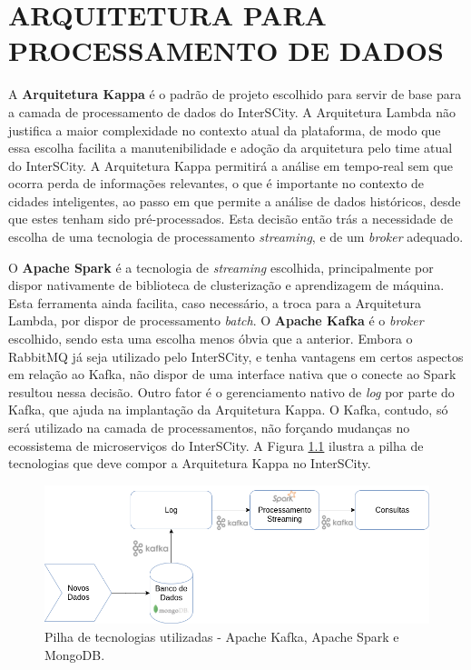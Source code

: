 \chapter[ARQUITETURA PARA PROCESSAMENTO DE DADOS]{ARQUITETURA PARA PROCESSAMENTO DE DADOS}
\label{chapter:architecture}

A \textbf{Arquitetura Kappa} é o padrão de projeto escolhido para servir de
base para a camada de processamento de dados do InterSCity. A Arquitetura
Lambda não justifica a maior complexidade no contexto atual da plataforma, de
modo que essa escolha facilita a manutenibilidade e adoção da arquitetura pelo
time atual do InterSCity. A Arquitetura Kappa permitirá a análise em tempo-real
sem que ocorra perda de informações relevantes, o que é importante no contexto de
cidades inteligentes, ao passo em que permite a análise de dados históricos,
desde que estes tenham sido pré-processados. Esta decisão então trás a
necessidade de escolha de uma tecnologia de processamento \textit{streaming},
e de um \textit{broker} adequado.

O \textbf{Apache Spark} é a tecnologia de \textit{streaming} escolhida,
principalmente por dispor nativamente de biblioteca de clusterização e
aprendizagem de máquina. Esta ferramenta ainda facilita, caso necessário, a
troca para a Arquitetura Lambda, por dispor de processamento \textit{batch}.
O \textbf{Apache Kafka} é o \textit{broker} escolhido, sendo esta uma escolha
menos óbvia que a anterior. Embora o RabbitMQ já seja utilizado pelo
InterSCity, e tenha vantagens em certos aspectos em relação ao Kafka, não
dispor de uma interface nativa que o conecte ao Spark resultou nessa decisão.
Outro fator é o gerenciamento nativo de \textit{log} por parte do
Kafka, que ajuda na implantação da Arquitetura Kappa. O Kafka, contudo, só
será utilizado na camada de processamentos, não forçando mudanças no
ecossistema de microserviços do InterSCity. A Figura \ref{fig:stack} ilustra
a pilha de tecnologias que deve compor a Arquitetura Kappa no InterSCity.

\begin{figure}
  \centering
    \includegraphics[scale=0.5]{figuras/kappa_tools.png}
  \caption{Pilha de tecnologias utilizadas - Apache Kafka, Apache Spark e MongoDB.}
  \label{fig:stack}
\end{figure}


